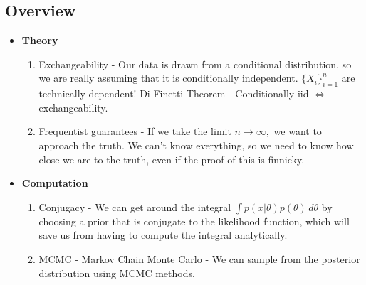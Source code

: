 \documentclass{chaistyle}
\begin{document}
\subsection*{Overview}
\begin{itemize}[-]
    \item \textbf{Theory}
    \begin{enumerate}
        \item Exchangeability - Our data is drawn from a conditional distribution, so we are really assuming that it is conditionally independent. \(\{X_i\}_{i=1}^n\) are technically dependent! Di Finetti Theorem - Conditionally iid \(\iff\) exchangeability.
        \item Frequentist guarantees - If we take the limit \(n\to\infty,\) we want to approach the truth. We can't know everything, so we need to know how close we are to the truth, even if the proof of this is finnicky.
    \end{enumerate}
    \item \textbf{Computation}
    \begin{enumerate}
        \item Conjugacy - We can get around the integral \(\int p(x|\theta)p(\theta)\,d\theta\) by choosing a prior that is conjugate to the likelihood function, which will save us from having to compute the integral analytically.
        \item MCMC - Markov Chain Monte Carlo - We can sample from the posterior distribution using MCMC methods.
    \end{enumerate}
\end{itemize}
\end{document}
